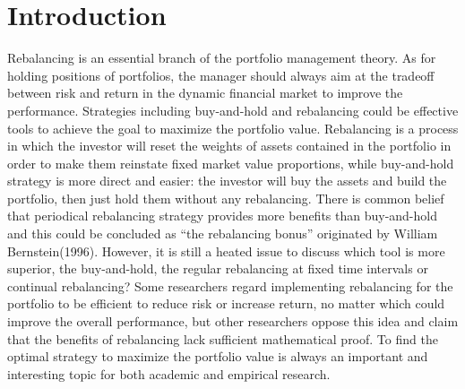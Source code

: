 \documentclass[
10pt, %
a4paper, %
oneside, %
headinclude,footinclude, %
BCOR5mm, %
]{scrartcl}
\begin{document}

\newpage %


\section{Introduction}
Rebalancing is an essential branch of the portfolio management theory. As for holding positions of portfolios, the manager should always aim at the tradeoff between risk and return in the dynamic financial market to improve the performance. Strategies including buy-and-hold and rebalancing could be effective tools to achieve the goal to maximize the portfolio value. Rebalancing is a process in which the investor will reset the weights of assets contained in the portfolio in order to make them reinstate fixed market value
proportions, while buy-and-hold strategy is more direct and easier: the investor will buy the assets and build the portfolio, then just hold them without any rebalancing. There is common belief that periodical rebalancing strategy provides more benefits than buy-and-hold and this could be concluded as “the rebalancing bonus” originated by William Bernstein(1996). However, it is still a heated issue to discuss which tool is more superior, the buy-and-hold, the regular rebalancing at fixed time intervals or continual rebalancing? Some researchers regard implementing rebalancing for the portfolio to be efficient to reduce risk or increase return, no matter which could improve the overall performance, but other researchers oppose this idea and claim that the benefits of rebalancing lack sufficient mathematical proof. To find the optimal strategy to maximize the portfolio value is always an important and interesting topic for both academic and empirical research.\\
\end{document}
